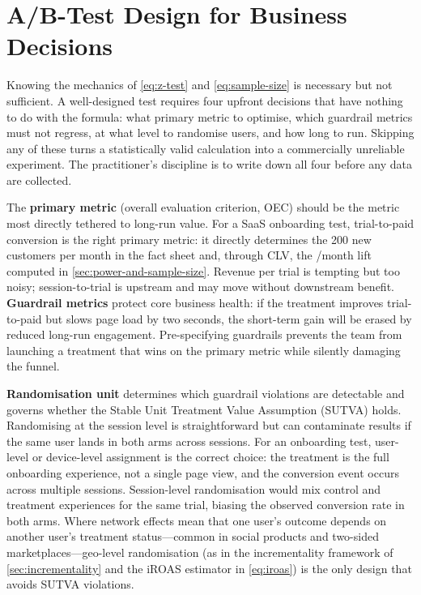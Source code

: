 \section{A/B-Test Design for Business Decisions}\label{sec:ab-test-design}

Knowing the mechanics of \cref{eq:z-test} and \cref{eq:sample-size} is necessary but not
sufficient. A well-designed test requires four upfront decisions that have nothing to do with
the formula: what primary metric to optimise, which guardrail metrics must not regress, at
what level to randomise users, and how long to run. Skipping any of these turns a statistically
valid calculation into a commercially unreliable experiment. The practitioner's discipline is
to write down all four before any data are collected.

The \textbf{primary metric} (overall evaluation criterion, OEC) should be the metric most
directly tethered to long-run value. For a SaaS onboarding test, trial-to-paid conversion
is the right primary metric: it directly determines the \num{200} new customers per month in
the fact sheet and, through CLV, the /month lift computed in
\cref{sec:power-and-sample-size}. Revenue per trial is tempting but too noisy; session-to-trial
is upstream and may move without downstream benefit. \textbf{Guardrail metrics} protect core
business health: if the treatment improves trial-to-paid but slows page load by two seconds,
the short-term gain will be erased by reduced long-run engagement. Pre-specifying guardrails
prevents the team from launching a treatment that wins on the primary metric while silently
damaging the funnel.

\textbf{Randomisation unit} determines which guardrail violations are detectable and governs
whether the Stable Unit Treatment Value Assumption (SUTVA) holds. Randomising at the session
level is straightforward but can contaminate results if the same user lands in both arms
across sessions. For an onboarding test, user-level or device-level assignment is the correct
choice: the treatment is the full onboarding experience, not a single page view, and the
conversion event occurs across multiple sessions. Session-level randomisation would mix
control and treatment experiences for the same trial, biasing the observed conversion rate
in both arms. Where network effects mean that one user's outcome depends on another user's
treatment status---common in social products and two-sided marketplaces---geo-level
randomisation (as in the incrementality framework of \cref{sec:incrementality} and the iROAS
estimator in \cref{eq:iroas}) is the only design that avoids SUTVA violations.

